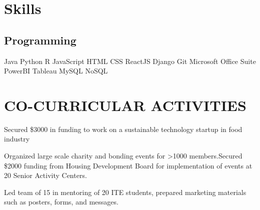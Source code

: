 \documentclass[]{deedy-resume}
\begin{document}
\begin{minipage}[t]{0.33\textwidth}

\section{Skills}
\subsection{Programming}
\textbullet{}Java 
\textbullet{}Python 
\textbullet{}R
\textbullet{}JavaScript
\textbullet{}HTML
\textbullet{}CSS
\textbullet{}ReactJS
\textbullet{}Django
\textbullet{}Git
\textbullet{}Microsoft Office Suite
\textbullet{}PowerBI
\textbullet{}Tableau
\textbullet{}MySQL
\textbullet{}NoSQL
\sectionsep


\section{CO-CURRICULAR ACTIVITIES}

Secured \$3000 in funding to work on a sustainable technology startup in food industry 

\sectionsep
{}
Organized large scale charity and bonding events for >1000 members.Secured \$2000 funding from Housing Development Board for implementation of events at 20 Senior Activity Centers.
\sectionsep

\sectionsep
{}
Led team of 15 in mentoring of 20 ITE students, prepared marketing materials such as posters, forms, and messages.
\sectionsep

%
%

\end{minipage} 
\hfill
\end{document}
